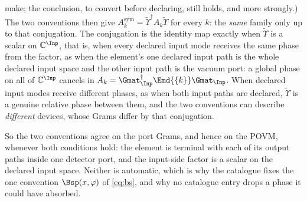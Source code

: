 \begin{remark}
\begin{itemize}[leftmargin=1.6em]
  make; the conclusion, to convert before declaring, still holds, and more
  strongly.) The two conventions then give
  $A_k^{\mathrm{sym}}=\widetilde\Upsilon^{\dagger}A_k\widetilde\Upsilon$ for
  every $k$: the \emph{same} family only up to that conjugation. The
  conjugation is the identity map exactly when $\widetilde\Upsilon$ is a
  scalar on $\mathbb{C}^{\Inp}$, that is, when every declared input mode
  receives the same phase from the factor, as when the element's one declared
  input path is the whole declared input space and the other input path is
  the vacuum port: a global phase on all of $\mathbb{C}^{\Inp}$ cancels in
  $A_k=\Gmat_{\Inp}^\dagger\Emd{\{k\}}\Gmat_{\Inp}$. When declared input modes
  receive different phases, as when both input paths are declared,
  $\widetilde\Upsilon$ is a genuine relative phase between them, and the two
  conventions can describe \emph{different} devices, whose Grams differ by
  that conjugation.
\end{itemize}
So the two conventions agree on the port Grams, and hence on the POVM,
whenever both conditions hold: the element is terminal with each of its
output paths inside one detector port, and the input-side factor is a scalar
on the declared input space.
Neither is automatic, which is why the catalogue fixes the one convention
$\Bsp(x,\varphi)$ of \eqref{eq:bs}, and why no catalogue entry drops a phase
it could have absorbed.
\end{remark}
